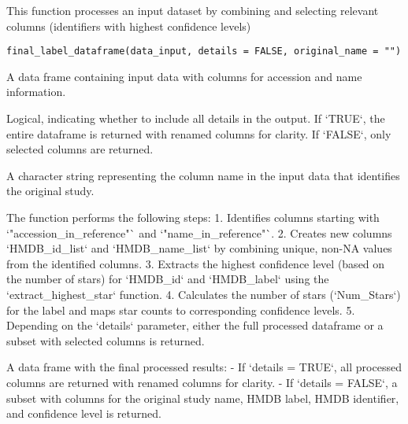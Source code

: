 \documentclass[a4paper]{book}
\begin{document}
%
\begin{Description}
This function processes an input dataset  by combining and selecting
relevant columns (identifiers with highest confidence levels)
\end{Description}
%
\begin{Usage}
\begin{verbatim}
final_label_dataframe(data_input, details = FALSE, original_name = "")
\end{verbatim}
\end{Usage}
%
\begin{Arguments}
\begin{ldescription}
\item[\code{data\_input}] A data frame containing input data with columns for accession and name information.

\item[\code{details}] Logical, indicating whether to include all details in the output. If `TRUE`, the entire dataframe is returned
with renamed columns for clarity. If `FALSE`, only selected columns are returned.

\item[\code{original\_name}] A character string representing the column name in the input data that identifies the original study.
\end{ldescription}
\end{Arguments}
%
\begin{Details}
The function performs the following steps:
1. Identifies columns starting with `"accession\_in\_reference"` and `"name\_in\_reference"`.
2. Creates new columns `HMDB\_id\_list` and `HMDB\_name\_list` by combining unique, non-NA values from the identified columns.
3. Extracts the highest confidence level (based on the number of stars) for `HMDB\_id` and `HMDB\_label` using the
`extract\_highest\_star` function.
4. Calculates the number of stars (`Num\_Stars`) for the label and maps star counts to corresponding confidence levels.
5. Depending on the `details` parameter, either the full processed dataframe or a subset with selected columns is returned.
\end{Details}
%
\begin{Value}
A data frame with the final processed results:
- If `details = TRUE`, all processed columns are returned with renamed columns for clarity.
- If `details = FALSE`, a subset with columns for the original study name, HMDB label, HMDB identifier, and confidence level
is returned.
\end{Value}
\end{document}
